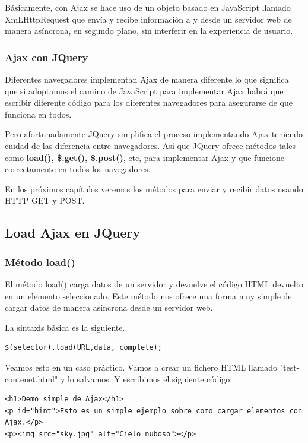 \documentclass[11pt]{article}
\begin{document}
Básicamente, con Ajax se hace uso de un objeto basado en JavaScript llamado XmLHttpRequest que envía y recibe información a y desde un servidor web de manera asíncrona, en segundo plano, sin interferir en la experiencia de usuario.

\subsubsection*{Ajax con JQuery}
\label{sec:org626bf5d}

Diferentes navegadores implementan Ajax de manera diferente lo que significa que si adoptamos el camino de JavaScript para implementar Ajax habrá que escribir diferente código para los diferentes navegadores para asegurarse de que funciona en todos. 

Pero afortunadamente JQuery simplifica el proceso implementando Ajax teniendo cuidad de las diferencia entre navegadores. Así que JQuery ofrece métodos tales como \textbf{load(), \$.get(), \$.post()}, etc, para implementar Ajax y que funcione correctamente en todos los navegadores.

En los próximos capítulos veremos los métodos para enviar y recibir datos usando HTTP GET y POST.

\subsection*{Load Ajax en JQuery}
\label{sec:org8de0003}

\subsubsection*{Método load()}
\label{sec:org7ff919c}

El método load() carga datos de un servidor y devuelve el código HTML devuelto en un elemento seleccionado. Este método nos ofrece una forma muy simple de cargar datos de manera asíncrona desde un servidor web. 

La sintaxis básica es la siguiente.

\begin{verbatim}
$(selector).load(URL,data, complete);
\end{verbatim}

Veamos esto en un caso práctico. Vamos a crear un fichero HTML llamado "test-contenet.html" y lo salvamos. Y escribimos el siguiente código:

\begin{verbatim}
<h1>Demo simple de Ajax</h1>
<p id="hint">Esto es un simple ejemplo sobre como cargar elementos con Ajax.</p>
<p><img src="sky.jpg" alt="Cielo nuboso"></p>
\end{verbatim}
\end{document}
